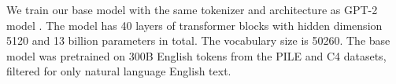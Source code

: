 We train our base model with the same tokenizer and architecture as GPT-2 model \cite{radford2019language}. The model has 40 layers of transformer blocks with hidden dimension 5120 and 13 billion parameters in total. The vocabulary size is 50260. The base model was pretrained on 300B English tokens from the PILE\cite{gao2020pile} and C4\cite{raffel2023exploring} datasets, filtered for only natural language English text.